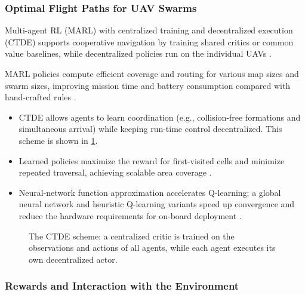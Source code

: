 \subsubsection{Optimal Flight Paths for UAV Swarms}

Multi-agent RL (MARL) with centralized training and decentralized execution
(CTDE) supports cooperative navigation by training shared critics or common value
baselines, while decentralized policies run on the individual UAVs
\cite{azzam2023swarm,lowe2017multi}.

MARL policies compute efficient coverage and routing for various map sizes and
swarm sizes, improving mission time and battery consumption compared with
hand-crafted rules \cite{xue2021multi}.
\begin{itemize}
  \item {} CTDE allows agents to learn coordination
        (e.g., collision-free formations and simultaneous arrival) while keeping
        run-time control decentralized. This scheme is shown in \cref{fig:ctde}.
  \item {} Learned policies maximize the reward for
        first-visited cells and minimize repeated traversal, achieving scalable
        area coverage \cite{xue2021multi}.
  \item {} Neural-network function approximation
        accelerates Q-learning; a global neural network and heuristic Q-learning
        variants speed up convergence and reduce the hardware requirements for
        on-board deployment \cite{lin2022review}.
\end{itemize}

\begin{figure}[htbp]
  \centering
  \caption{The CTDE scheme: a centralized critic is trained on the observations
           and actions of all agents, while each agent executes its own
           decentralized actor.}
  \label{fig:ctde}
\end{figure}

\subsubsection{Rewards and Interaction with the Environment}

